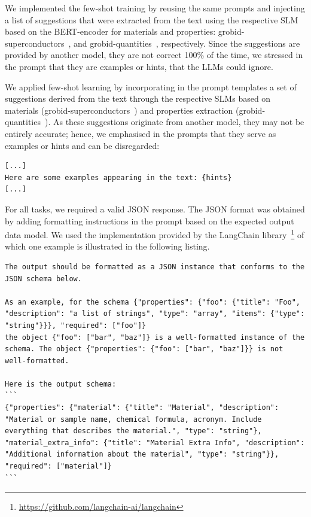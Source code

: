 \documentclass[a4paper]{article}
\begin{document}
We implemented the few-shot training by reusing the same prompts and injecting a list of suggestions that were extracted from the text using the respective SLM based on the BERT-encoder for materials and properties: grobid-superconductors~\cite{lfoppiano2023automatic}, and grobid-quantities~\cite{foppiano2019quantities}, respectively.
Since the suggestions are provided by another model, they are not correct 100\% of the time, we stressed in the prompt that they are examples or hints, that the LLMs could ignore. 

We applied few-shot learning by incorporating in the prompt templates a set of suggestions derived from the text through the respective SLMs based on materials (grobid-superconductors~\cite{lfoppiano2023automatic}) and properties extraction (grobid-quantities~\cite{foppiano2019quantities}). 
As these suggestions originate from another model, they may not be entirely accurate; hence, we emphasised in the prompts that they serve as examples or hints and can be disregarded: 

\begin{lstlisting}[caption=Few-shot learning modified prompt template.]
[...]
Here are some examples appearing in the text: {hints}
[...]
\end{lstlisting}

For all tasks, we required a valid JSON response. The JSON format was obtained by adding formatting instructions in the prompt based on the expected output data model. 
We used the implementation provided by the LangChain library~\footnote{\url{https://github.com/langchain-ai/langchain}} of which one example is illustrated in the following listing. 

\begin{lstlisting}[caption=Example of formatting instruction to a valid JSON format]
The output should be formatted as a JSON instance that conforms to the JSON schema below.

As an example, for the schema {"properties": {"foo": {"title": "Foo", "description": "a list of strings", "type": "array", "items": {"type": "string"}}}, "required": ["foo"]}
the object {"foo": ["bar", "baz"]} is a well-formatted instance of the schema. The object {"properties": {"foo": ["bar", "baz"]}} is not well-formatted.

Here is the output schema:
```
{"properties": {"material": {"title": "Material", "description": "Material or sample name, chemical formula, acronym. Include everything that describes the material.", "type": "string"}, "material_extra_info": {"title": "Material Extra Info", "description": "Additional information about the material", "type": "string"}}, "required": ["material"]}
```
\end{lstlisting}
\end{document}
